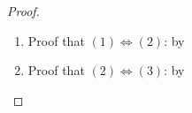 \begin{proof}
\begin{enumerate}
  \item Proof that $(1)\iff (2)$: by 

  \item Proof that $(2) \iff (3)$: by 


\end{enumerate}
\end{proof}
